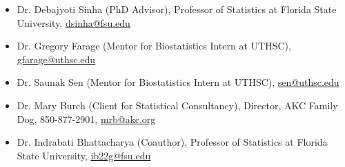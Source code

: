 \documentclass[11pt,a4paper]{article}
\begin{document}
\begin{itemize}[leftmargin=*]
  \item Dr. Debajyoti Sinha (PhD Advisor), Professor of Statistics at Florida State University, \href{mailto:dsinha@fsu.edu}{dsinha@fsu.edu}
  \item Dr. Gregory Farage (Mentor for Biostatistics Intern at UTHSC), \href{mailto:gfarage@uthsc.edu}{gfarage@uthsc.edu}
  \item Dr. Saunak Sen (Mentor for Biostatistics Intern at UTHSC), \href{mailto:sen@uthsc.edu}{sen@uthsc.edu}
  \item Dr. Mary Burch (Client for Statistical Consultancy), Director, AKC Family Dog, 850-877-2901, \href{mailto:mrb@akc.org}{mrb@akc.org}
  \item Dr. Indrabati Bhattacharya (Coauthor), Professor of Statistics at Florida State University, \href{mailto:ib22g@fsu.edu}{ib22g@fsu.edu}
\end{itemize}
\end{document}
